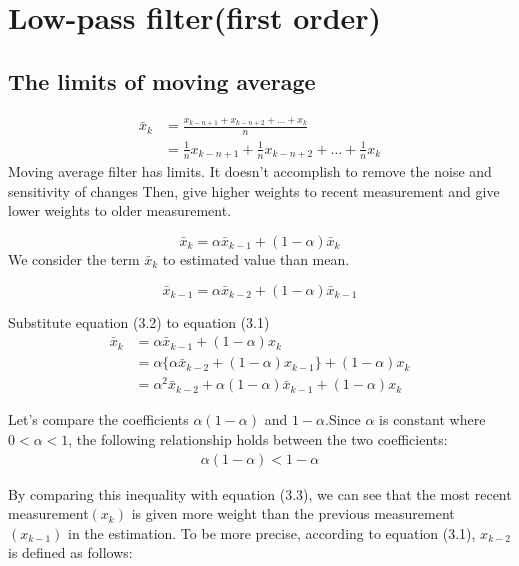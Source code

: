 \documentclass{article}
\numberwithin{equation}{section} %
\begin{document}
\section{Low-pass filter(first order)}
\subsection{The limits of moving average}

\begin{align*}
    \bar{x}_k & = \frac{x_{k-n+1} + x_{k-n+2} + \ldots + x_k}{n}                           \\
              & = \frac{1}{n} x_{k-n+1} + \frac{1}{n} x_{k-n+2} + \ldots + \frac{1}{n} x_k
\end{align*}
Moving average filter has limits. It doesn't accomplish to remove the noise and sensitivity of changes
Then, give higher weights to recent measurement and give lower weights to older measurement.

\begin{equation}
    \bar{x}_k = \alpha\bar{x}_{k-1} + (1 - \alpha)\bar{x}_k
\end{equation}
We consider the term \(\bar{x}_k\) to estimated value than mean.

\begin{equation}
    \bar{x}_{k-1} = \alpha\bar{x}_{k-2} + (1 - \alpha)\bar{x}_{k-1}
\end{equation}

Substitute equation (3.2) to equation (3.1)
\begin{align}
    \bar{x}_k & = \alpha\bar{x}_{k-1} + (1 - \alpha)x_k \nonumber                                 \\
              & = \alpha\{\alpha\bar{x}_{k-2} + (1 - \alpha)x_{k-1}\} + (1 - \alpha)x_k \nonumber \\
              & = \alpha^2\bar{x}_{k-2} + \alpha(1 - \alpha)\bar{x}_{k-1} + (1 - \alpha)x_k
\end{align}

Let's compare the coefficients \(\alpha(1-\alpha)\) and \(1 - \alpha\).Since \(\alpha\) is constant where \(0 < \alpha < 1 \),  the following relationship holds between the two coefficients:
\begin{align*}
    \alpha(1-\alpha) < 1 - \alpha
\end{align*}

By comparing this inequality with equation (3.3), we can see that the most recent measurement\( (x_k) \) is given more weight than the previous measurement \((x_{k-1})\) in the estimation. To be more precise, according to equation (3.1), \(x_{k-2}\) is defined as follows:
\end{document}
